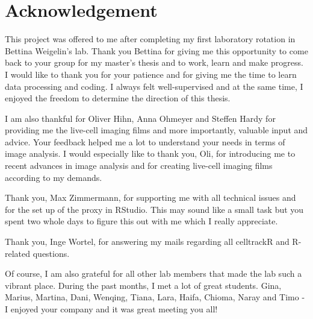 \documentclass{report}
\begin{document}
\allsectionsfont{\sffamily}
\onehalfspacing

\setlength\parindent{0pt}

\chapter*{Acknowledgement}

This project was offered to me after completing my first laboratory rotation in Bettina Weigelin's lab.  Thank you Bettina for giving me this opportunity to come back to your group for my master's thesis and to work, learn and make progress. I would like to thank you for your patience and for giving me the time to learn data processing and coding. I always felt well-supervised and at the same time, I enjoyed the freedom to determine the direction of this thesis.

I am also thankful for Oliver Hihn, Anna Ohmeyer and Steffen Hardy for providing me the live-cell imaging films and more importantly, valuable input and advice. Your feedback helped me a lot to understand your needs in terms of image analysis. I would especially like to thank you, Oli, for introducing me to recent advances in image analysis and for creating live-cell imaging films according to my demands.

Thank you, Max Zimmermann, for supporting me with all technical issues and for the set up of the proxy in RStudio. This may sound like a small task but you spent two whole days to figure this out with me which I really appreciate.

Thank you, Inge Wortel, for answering my mails regarding all celltrackR and R-related questions.

Of course, I am also grateful for all other lab members that made the lab such a vibrant place. During the past months, I met a lot of great students. Gina, Marius, Martina, Dani, Wenqing, Tiana, Lara, Haifa, Chioma, Naray and Timo - I enjoyed your company and it was great meeting you all!




\renewcommand{\bibname}{References}

\end{document}

